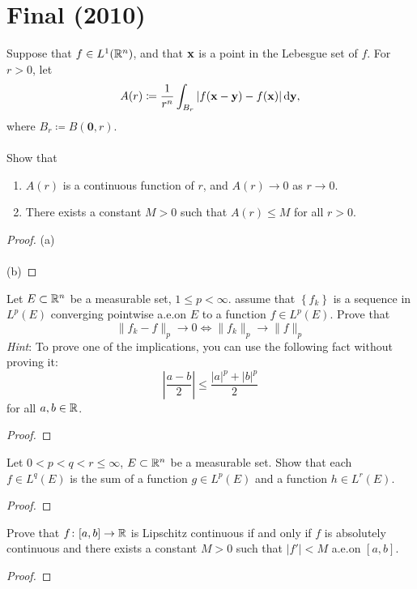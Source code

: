 \section{Final (2010)}
\begin{problem}
Suppose that $f\in L^1(\mathbb{R}^n)$, and that $\mathbf{x}$ is a point in the Lebesgue
set of $f$. For $r>0$, let
\[
A(r)\coloneqq \frac{1}{r^n}\int_{B_r}|f(\mathbf{x}-\mathbf{y})-f(\mathbf{x})|\mathop{}\!\mathrm{d}\mathbf{y},
\]
where $B_r\coloneqq B(\mathbf{0},r)$.
\\\\
Show that
\begin{enumerate}[label=(\alph*)]
\item $A(r)$ is a continuous function of $r$, and $A(r)\to 0$ as $r\to 0$.
\item There exists a constant $M>0$ such that $A(r)\leq M$ for all $r>0$.
\end{enumerate}
\end{problem}
\begin{proof}
(a)
\\\\
(b)
\end{proof}

\begin{problem}
Let $E\subset\mathbb{R}^n$ be a measurable set, $1\leq p<\infty$. assume that
$\left\{ f_k \right\}$ is a sequence in $L^p(E)$ converging pointwise
a.e.\@ on $E$ to a function $f\in L^p(E)$. Prove that
\[
\|f_k-f\|_p\longrightarrow 0\iff
\|f_k\|_p\longrightarrow\|f\|_p
\]
\emph{Hint}: To prove one of the implications, you can use the following
fact without proving it:
\[
\left|
\frac{a-b}{2}
\right|
\leq
\frac{|a|^p+|b|^p}{2}
\]
for all $a,b\in\mathbb{R}$.
\end{problem}
\begin{proof}
\end{proof}

\begin{problem}
Let $0<p<q<r\leq\infty$, $E\subset\mathbb{R}^n$ be a measurable set. Show that
each $f\in L^q(E)$ is the sum of a function $g\in L^p(E)$ and a function
$h\in L^r(E)$.
\end{problem}
\begin{proof}
\end{proof}

\begin{problem}
Prove that $f\colon[a,b]\to\mathbb{R}$ is Lipschitz continuous if and only if $f$
is absolutely continuous and there exists a constant $M>0$ such that
$|f'|<M$ a.e.\@ on $[a,b]$.
\end{problem}
\begin{proof}
\end{proof}

